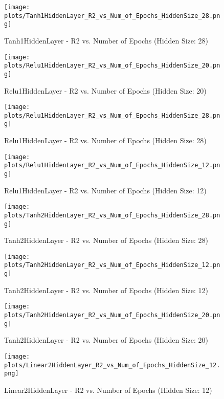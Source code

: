 \begin{figure}[H]
    \centering
    \texttt{[image: plots/Tanh1HiddenLayer\_R2\_vs\_Num\_of\_Epochs\_HiddenSize\_28.png]}
    \caption{Tanh1HiddenLayer - R2 vs. Number of Epochs (Hidden Size: 28)}
\end{figure}

\begin{figure}[H]
    \centering
    \texttt{[image: plots/Relu1HiddenLayer\_R2\_vs\_Num\_of\_Epochs\_HiddenSize\_20.png]}
    \caption{Relu1HiddenLayer - R2 vs. Number of Epochs (Hidden Size: 20)}
\end{figure}

\begin{figure}[H]
    \centering
    \texttt{[image: plots/Relu1HiddenLayer\_R2\_vs\_Num\_of\_Epochs\_HiddenSize\_28.png]}
    \caption{Relu1HiddenLayer - R2 vs. Number of Epochs (Hidden Size: 28)}
\end{figure}

\begin{figure}[H]
    \centering
    \texttt{[image: plots/Relu1HiddenLayer\_R2\_vs\_Num\_of\_Epochs\_HiddenSize\_12.png]}
    \caption{Relu1HiddenLayer - R2 vs. Number of Epochs (Hidden Size: 12)}
\end{figure}

\begin{figure}[H]
    \centering
    \texttt{[image: plots/Tanh2HiddenLayer\_R2\_vs\_Num\_of\_Epochs\_HiddenSize\_28.png]}
    \caption{Tanh2HiddenLayer - R2 vs. Number of Epochs (Hidden Size: 28)}
\end{figure}

\begin{figure}[H]
    \centering
    \texttt{[image: plots/Tanh2HiddenLayer\_R2\_vs\_Num\_of\_Epochs\_HiddenSize\_12.png]}
    \caption{Tanh2HiddenLayer - R2 vs. Number of Epochs (Hidden Size: 12)}
\end{figure}

\begin{figure}[H]
    \centering
    \texttt{[image: plots/Tanh2HiddenLayer\_R2\_vs\_Num\_of\_Epochs\_HiddenSize\_20.png]}
    \caption{Tanh2HiddenLayer - R2 vs. Number of Epochs (Hidden Size: 20)}
\end{figure}

\begin{figure}[H]
    \centering
    \texttt{[image: plots/Linear2HiddenLayer\_R2\_vs\_Num\_of\_Epochs\_HiddenSize\_12.png]}
    \caption{Linear2HiddenLayer - R2 vs. Number of Epochs (Hidden Size: 12)}
\end{figure}

